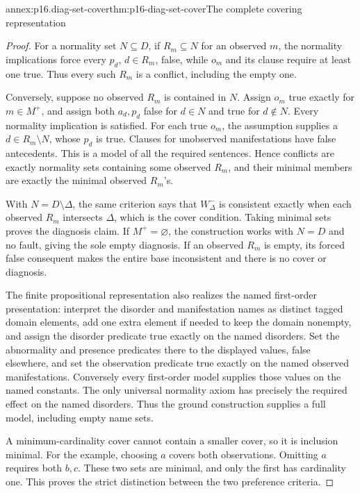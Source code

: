\begin{annexitem}{annex:p16.diag-set-cover}{thm:p16-diag-set-cover}{The complete covering representation}
\begin{proof}
For a normality set \(N\subseteq D\), if
\(R_m\subseteq N\) for an observed \(m\),
the normality implications force every
\(p_d\), \(d\in R_m\), false, while \(o_m\)
and its clause require at least one true.
Thus every such \(R_m\) is a conflict,
including the empty one.

Conversely, suppose no observed \(R_m\) is
contained in \(N\). Assign \(o_m\) true
exactly for \(m\in M^+\), and assign both
\(a_d,p_d\) false for \(d\in N\) and true
for \(d\notin N\). Every normality implication
is satisfied. For each true \(o_m\), the
assumption supplies a \(d\in R_m\setminus N\),
whose \(p_d\) is true. Clauses for unobserved
manifestations have false antecedents.
This is a model of all the required sentences.
Hence conflicts are exactly normality sets
containing some observed \(R_m\), and their
minimal members are exactly the minimal
observed \(R_m\)'s.

With \(N=D\setminus\Delta\), the same criterion
says that \(W^-_\Delta\) is consistent exactly
when each observed \(R_m\) intersects \(\Delta\),
which is the cover condition. Taking minimal
sets proves the diagnosis claim. If
\(M^+=\varnothing\), the construction works
with \(N=D\) and no fault, giving the sole
empty diagnosis. If an observed \(R_m\)
is empty, its forced false consequent makes
the entire base inconsistent and there is
no cover or diagnosis.

The finite propositional representation also
realizes the named first-order presentation:
interpret the disorder and manifestation names
as distinct tagged domain elements, add one
extra element if needed to keep the domain
nonempty, and assign the disorder predicate true exactly
on the named disorders. Set the abnormality
and presence predicates there to the displayed
values, false elsewhere, and set the observation
predicate true exactly on the named observed
manifestations. Conversely every
first-order model supplies those values on
the named constants. The only universal
normality axiom has precisely the required
effect on the named disorders. Thus the
ground construction supplies a full model,
including empty name sets.

A minimum-cardinality cover cannot contain
a smaller cover, so it is inclusion minimal.
For the example, choosing \(a\) covers both
observations. Omitting \(a\) requires both
\(b,c\). These two sets are minimal, and
only the first has cardinality one. This
proves the strict distinction between the
two preference criteria.
\end{proof}
\end{annexitem}

